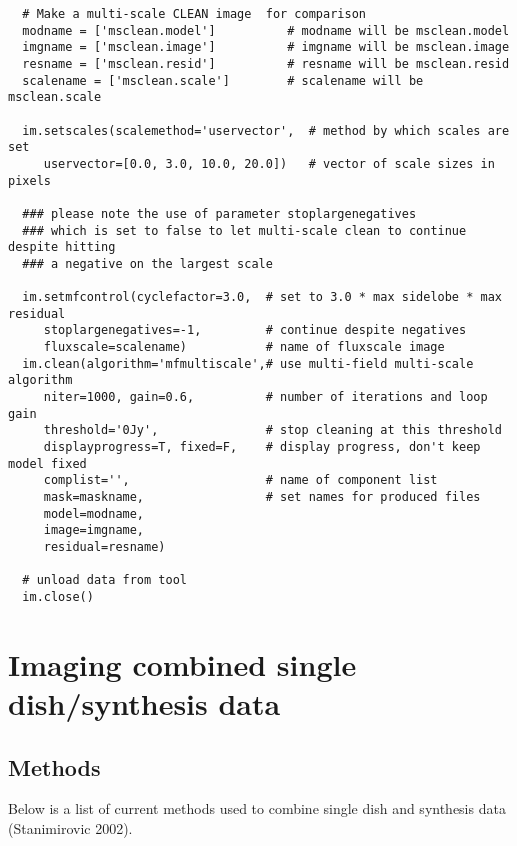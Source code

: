 \begin{verbatim}
  # Make a multi-scale CLEAN image  for comparison
  modname = ['msclean.model']          # modname will be msclean.model
  imgname = ['msclean.image']          # imgname will be msclean.image
  resname = ['msclean.resid']          # resname will be msclean.resid
  scalename = ['msclean.scale']        # scalename will be msclean.scale

  im.setscales(scalemethod='uservector',  # method by which scales are set
     uservector=[0.0, 3.0, 10.0, 20.0])   # vector of scale sizes in pixels

  ### please note the use of parameter stoplargenegatives
  ### which is set to false to let multi-scale clean to continue despite hitting
  ### a negative on the largest scale

  im.setmfcontrol(cyclefactor=3.0,  # set to 3.0 * max sidelobe * max residual
     stoplargenegatives=-1,         # continue despite negatives
     fluxscale=scalename)           # name of fluxscale image
  im.clean(algorithm='mfmultiscale',# use multi-field multi-scale algorithm
     niter=1000, gain=0.6,          # number of iterations and loop gain
     threshold='0Jy',               # stop cleaning at this threshold
     displayprogress=T, fixed=F,    # display progress, don't keep model fixed
     complist='',                   # name of component list
     mask=maskname,                 # set names for produced files
     model=modname,
     image=imgname,
     residual=resname)

  # unload data from tool
  im.close()
\end{verbatim}
\normalsize


\section{Imaging combined single dish/synthesis data}
\label{section:imtool.SDcombo}

\subsection{Methods}
\label{section:imtool.SDcombo.methods}

Below is a list of current methods used to combine single dish and
synthesis data (Stanimirovic 2002).


